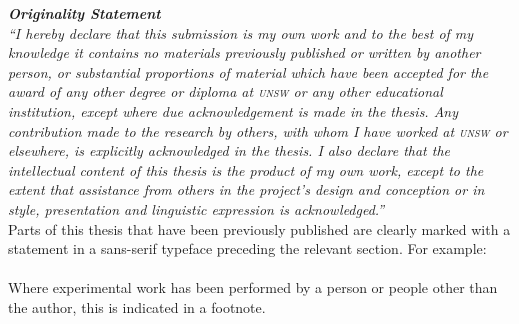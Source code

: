 \begin{center}
\begin{minipage}{0.75\textwidth}
\vspace{4cm}
  \textit{
    \textbf{Originality Statement}\\
    ``I hereby declare that this submission is my own work and to the best of my knowledge it contains no materials previously published or written by another person, or substantial proportions of material which have been accepted for the award of any other degree or diploma at \textsc{unsw} or any other educational institution, except where due acknowledgement is made in the thesis. 
    Any contribution made to the research by others, with whom I have worked at \textsc{unsw} or elsewhere, is explicitly acknowledged in the thesis. 
    I also declare that the intellectual content of this thesis is the product of my own work, except to the extent that assistance from others in the project's design and conception or in style, presentation and linguistic expression is acknowledged.''
  }
  \vspace{2cm}\\
  Parts of this thesis that have been previously published are clearly marked with a statement in a sans-serif typeface preceding the relevant section. For example:
  \vspace{0.5cm}\\
  \vspace{0.5cm}\\
  Where experimental work has been performed by a person or people other than the author, this is indicated in a footnote.
\end{minipage}
\end{center}
